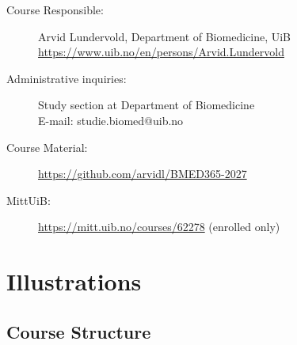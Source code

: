 \documentclass[11pt,a4paper]{article}
\begin{document}
\begin{description}
    \item[Course Responsible:] Arvid Lundervold, Department of Biomedicine, UiB\\
    \url{https://www.uib.no/en/persons/Arvid.Lundervold}
    
    \item[Administrative inquiries:] Study section at Department of Biomedicine\\
    E-mail: studie.biomed@uib.no
    
    \item[Course Material:] \url{https://github.com/arvidl/BMED365-2027}
    
    \item[MittUiB:] \url{https://mitt.uib.no/courses/62278} (enrolled only)
\end{description}

\newpage



\appendix
\section{Illustrations}

\subsection{Course Structure}
\end{document}
